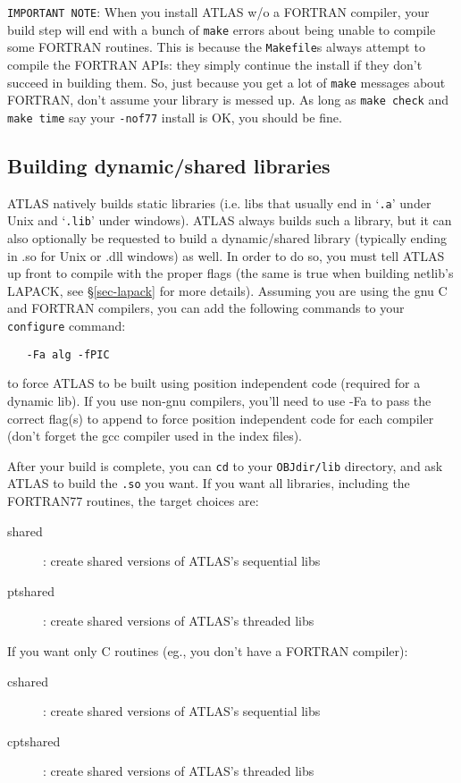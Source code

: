 \documentclass[11pt]{article}
\begin{document}
{\tt IMPORTANT NOTE}: When you install ATLAS w/o a FORTRAN compiler,
your build step will end with a bunch of {\tt make} errors about being
unable to compile some FORTRAN routines.  This is because the {\tt Makefile}s
always attempt to compile the FORTRAN APIs: they simply continue the install
if they don't succeed in building them.  So, just because you get a lot
of {\tt make} messages about FORTRAN, don't assume your library is messed
up.  As long as {\tt make check} and {\tt make time} say your {\tt -nof77}
install is OK, you should be fine.

\subsection{Building dynamic/shared libraries}
\label{sec-shared}
ATLAS natively builds static libraries (i.e. libs that usually end in
`\texttt{.a}' under Unix and `\texttt{.lib}' under windows).  
ATLAS always builds such a library,
but it can also optionally be requested to build a dynamic/shared library
(typically ending in .so for Unix or .dll windows) as well.  In order to do so,
you must tell ATLAS up front to compile with the proper flags (the same is
true when building netlib's LAPACK, see \S\ref{sec-lapack} for more details).  
Assuming
you are using the gnu C and FORTRAN compilers, you can add the following
commands to your {\tt configure} command:
\vspace*{-0.1in}
\begin{verbatim}
   -Fa alg -fPIC
\end{verbatim}
to force ATLAS to be built using position independent code (required for a
dynamic lib).  If you use non-gnu compilers, you'll need to use -Fa to
pass the correct flag(s) to append to force position independent code for
each compiler (don't forget the gcc compiler used in the index files).

After your build is complete, you can {\tt cd} to your {\tt OBJdir/lib} 
directory, and
ask ATLAS to build the {\tt .so} you want.  If you want all libraries, including
the FORTRAN77 routines, the target choices are:
\begin{description}
\item [shared] : create shared versions of ATLAS's sequential libs
\item [ptshared] : create shared versions of ATLAS's threaded libs
\end{description}
If you want only C routines (eg., you don't have a FORTRAN compiler):
\begin{description}
\item [cshared] : create shared versions of ATLAS's sequential libs
\item [cptshared] : create shared versions of ATLAS's threaded libs
\end{description}
\end{document}
